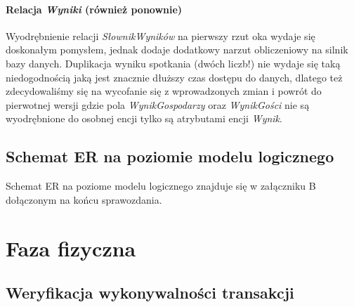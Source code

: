 \documentclass{mwrep}
\begin{document}
\subsubsection{Relacja \emph{Wyniki} (również ponownie)}
Wyodrębnienie relacji \emph{SłownikWyników} na pierwszy rzut oka wydaje się doskonałym pomysłem, jednak dodaje dodatkowy narzut obliczeniowy
na silnik bazy danych. Duplikacja wyniku spotkania (dwóch liczb!) nie wydaje się taką niedogodnością jaką jest znacznie dłuższy czas dostępu do danych, dlatego też 
zdecydowaliśmy się na wycofanie się z wprowadzonych zmian i powrót do pierwotnej wersji gdzie pola \emph{WynikGospodarzy} oraz \emph{WynikGości}
nie są wyodrębnione do osobnej encji tylko są atrybutami encji \emph{Wynik}.

\section{Schemat ER na poziomie modelu logicznego}
Schemat ER na poziome modelu logicznego znajduje się w załączniku B dołączonym na końcu sprawozdania.

\chapter{Faza fizyczna}

\section{Weryfikacja wykonywalności transakcji}
\end{document}
